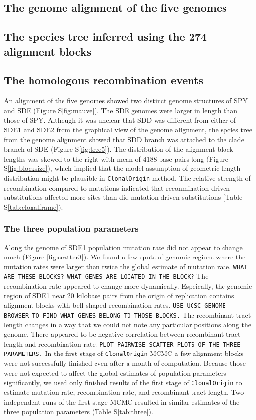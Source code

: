 \documentclass[english]{article}
\begin{document}
\subsection{The genome alignment of the five genomes}

\subsection{The species tree inferred using the 274 alignment blocks}


\subsection{The homologous recombination events}
An alignment of the five genomes showed two distinct genome structures of SPY
and SDE (Figure S\ref{fig:mauve}). The SDE genomes were larger in length than
those of SPY. Although it was unclear that SDD was different from either of SDE1
and SDE2 from the graphical view of the genome alignment, the spcies tree from
the genome alignment showed that SDD branch was attached to the clade branch of
SDE (Figure S\ref{fig:tree5}). The distribution of the alignment block lengths
was skewed to the right with mean of 4188 base pairs long (Figure
S\ref{fig:blocksize}), which implied that the model assumption of geometric
length distribution might be plausible in \texttt{ClonalOrigin} method.  The
relative strength of recombination compared to mutations indicated that
reconmination-driven substitutions affected more sites than did mutation-driven
substitutions (Table S\ref{tab:clonalframe}).

\subsubsection{The three population parameters}
Along the genome of SDE1 population mutation rate did not appear to change much
(Figure \ref{fig:scatter3}).  We found a few spots of genomic regions where the
mutation rates were larger than twice the global estimate of mutation rate.
\texttt{WHAT ARE THESE BLOCKS? WHAT GENES ARE LOCATED IN THE BLOCK?}
The recombination rate appeared to change more dynamically. Espeically, the
genomic region of SDE1 near 20 kilobase pairs from the origin of replication
contains alignment blocks with bell-shaped recombination rates.
\texttt{USE UCSC GENOME BROWSER TO FIND WHAT GENES BELONG TO THOSE BLOCKS.}
The recombinant tract length changes in a way that we could not note any
particular positions along the genome.
There appeared to be negative correlation between recombinant tract length and
recombination rate.
\texttt{PLOT PAIRWISE SCATTER PLOTS OF THE THREE PARAMETERS.}
In the first stage of \texttt{ClonalOrigin} MCMC a few alignment blocks were not
successfully finished even after a month of computation.  Because those were not
expected to affect the global estimates of population parameters significantly,
we used only finished results of the first stage of \texttt{ClonalOrigin} to
estimate mutation rate, recombination rate, and recombinant tract length.  Two
independent runs of the first stage MCMC resulted in similar estimates of the
three population parameters (Table S\ref{tab:three}).
\end{document}
